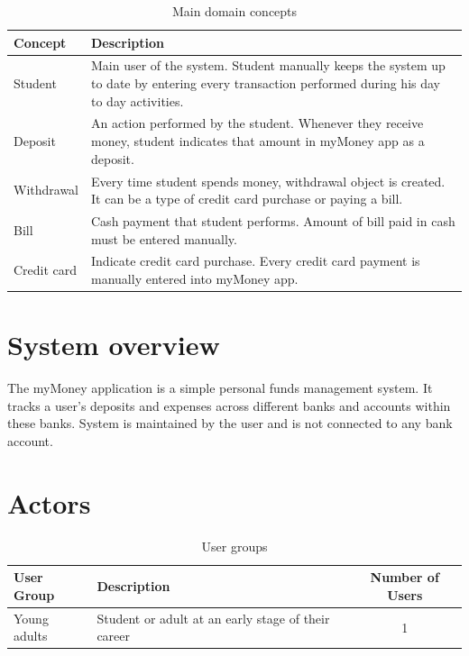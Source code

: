 \documentclass[12pt]{article}
\begin{document}
 
 
\begin{table}[H]
\caption{Main domain concepts}
\begin{center}
\begin{tabular}{|p{3cm}|p{12cm}|}
\hline
Concept & Description \\
\hline\hline
Student & Main user of the system. Student manually keeps the system up to date by entering every transaction performed during his day to day activities.  \\
\hline
Deposit & An action performed by the student. Whenever they receive money, student indicates that amount in myMoney app as a deposit. \\
\hline
Withdrawal & Every time student spends money, withdrawal object is created. It can be a type of credit card purchase or paying a bill. \\
\hline
Bill & Cash payment that student performs. Amount of bill paid in cash must be entered manually. \\
\hline
Credit card & Indicate credit card purchase. Every credit card payment is manually entered into myMoney app. \\
\hline
\end{tabular}
\end{center}
\end{table}

\section{System overview}


The myMoney application is a simple personal funds management system. It tracks a user's deposits and expenses across different banks and accounts within these banks. System is maintained by the user and is not connected to any bank account.

\section{Actors}

\begin{table}[H]
  \caption{User groups}
  \begin{center}
    \begin{tabular}{|l|p{8cm}|c|}
      \hline
      User Group & Description & Number of Users\\
      \hline\hline
      Young adults & Student or adult at an early stage of their career & 1\\
      \hline
    \end{tabular}
  \end{center}
\end{table}
\end{document}
